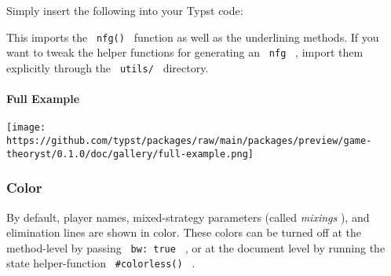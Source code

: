 Simply insert the following into your Typst code:

\begin{Shaded}
\begin{Highlighting}[]
\end{Highlighting}
\end{Shaded}

This imports the \texttt{\ nfg()\ } function as well as the underlining
methods. If you want to tweak the helper functions for generating an
\texttt{\ nfg\ } , import them explicitly through the
\texttt{\ utils/\ } directory.

\paragraph{Full Example}\label{full-example}

\begin{Shaded}
\begin{Highlighting}[]
\NormalTok{  ),}
\NormalTok{  [$0,vul(100000000)$], [$0,1$], [$0,0$],}
\NormalTok{)}
\end{Highlighting}
\end{Shaded}

\texttt{[image: https://github.com/typst/packages/raw/main/packages/preview/game-theoryst/0.1.0/doc/gallery/full-example.png]}

\subsubsection{Color}\label{color}

By default, player names, mixed-strategy parameters (called
\emph{mixings} ), and elimination lines are shown in color. These colors
can be turned off at the method-level by passing \texttt{\ bw:\ true\ }
, or at the document level by running the state helper-function
\texttt{\ \#colorless()\ } .

